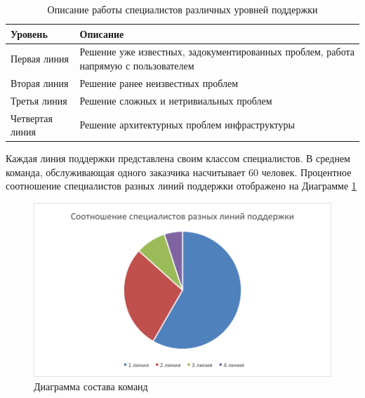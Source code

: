 \begin{table} [htbp]
  \centering
  \parbox{15cm}{\caption{Описание работы специалистов различных уровней поддержки}\label{TSSDescription}}
  \begin{tabular}{| p{7cm} || p{7cm} |}
  \hline
  \hline
Уровень & Описание \\
  \hline
    \hline

Первая линия	& Решение уже известных, задокументированных проблем, работа напрямую с пользователем \\
  \hline

Вторая линия  & Решение ранее неизвестных проблем \\
  \hline

Третья линия & Решение сложных и нетривиальных проблем \\
  \hline

Четвертая линия  & Решение архитектурных проблем инфраструктуры \\

  \hline
  \hline
  \end{tabular}
\end{table}


Каждая линия поддержки представлена своим классом специалистов. В среднем команда, обслуживающая одного заказчика насчитывает 60 человек. Процентное соотношение специалистов разных линий поддержки отображено на Диаграмме \ref{img:ITSMTeamComposition}

\begin{figure} [h] 
  \center
  \includegraphics [scale=0.7] {ITSMTeamComposition}
  \caption{Диаграмма состава команд} 
  \label{img:ITSMTeamComposition}  
\end{figure}

